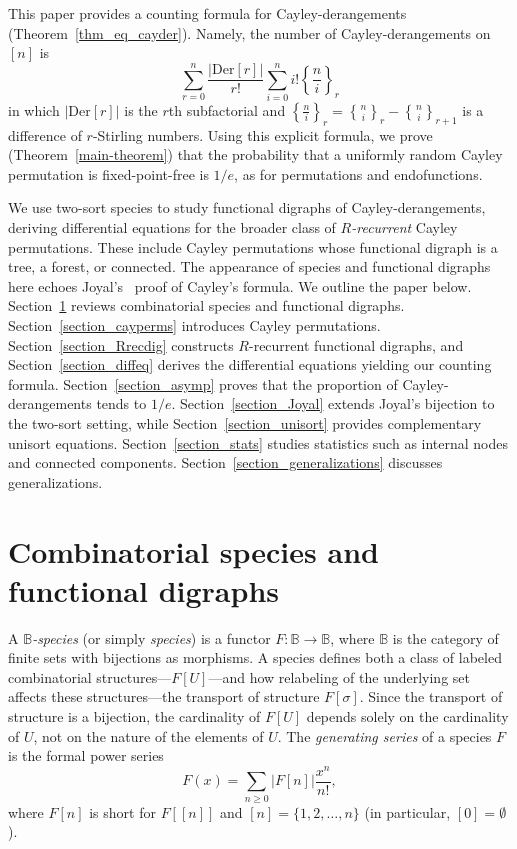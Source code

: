\documentclass[a4paper,11pt,UKenglish]{article}
\newcommand{\BB}{\mathbb{B}}
\newcommand{\Der}{\mathrm{Der}}
\newcommand{\stirl}[3]{\genfrac{\{}{\}}{0pt}{}{{#1}}{{#2}}_{{#3}}}
\newcommand{\sdiff}[3]{\genfrac{\{}{\}}{}{}{{#1}}{{#2}}_{{#3}}}
\theoremstyle{definition}
\begin{document}

This paper provides a counting formula for Cayley-derangements
(Theorem~\ref{thm_eq_cayder}). Namely, the number of Cayley-derangements
on $[n]$ is
\[
  \sum_{r=0}^n\frac{|\Der[r]|}{r!}\sum_{i=0}^ni!\sdiff{n}{i}{r}
\]
in which $|\Der[r]|$ is the $r$th subfactorial and
$\sdiff{n}{i}{r} = \stirl{n}{i}{r}-\stirl{n}{i}{r+1}$ is a difference
of $r$-Stirling numbers. Using this explicit formula,
we prove (Theorem~\ref{main-theorem}) that the probability
that a uniformly random Cayley permutation is fixed-point-free
is $1/e$, as for permutations and endofunctions.

We use two-sort species to study functional digraphs of
Cayley-derangements, deriving differential equations for the broader
class of \emph{$R$-recurrent} Cayley permutations. These include
Cayley permutations whose functional digraph is a tree, a forest,
or connected. The appearance of species and functional digraphs
here echoes Joyal's~\cite{J} proof of Cayley's formula.
We outline the paper below.
Section~\ref{section_species} reviews combinatorial species and
functional digraphs. Section~\ref{section_cayperms} introduces Cayley
permutations. Section~\ref{section_Rrecdig} constructs $R$-recurrent
functional digraphs, and Section~\ref{section_diffeq} derives the
differential equations yielding our counting formula.
Section~\ref{section_asymp} proves that the proportion of
Cayley-derangements tends to $1/e$.
Section~\ref{section_Joyal} extends Joyal's bijection to the
two-sort setting, while Section~\ref{section_unisort} provides
complementary unisort equations. Section~\ref{section_stats} studies statistics
such as internal nodes and connected components.
Section~\ref{section_generalizations} discusses generalizations.



\section{Combinatorial species and functional digraphs}\label{section_species}

A \emph{$\BB$-species} (or simply \emph{species}) is a functor
$F:\BB\to\BB$, where $\BB$ is the category of finite sets with
bijections as morphisms.  A species defines both a class of labeled
combinatorial structures---$F[U]$---and how relabeling of the
underlying set affects these structures---the transport of structure
$F[\sigma]$. Since the transport of structure is a bijection, the
cardinality of $F[U]$ depends solely on the cardinality of $U$, not on
the nature of the elements of $U$.  The \emph{generating series} of a
species $F$ is the formal power series
$$
F(x)=\sum_{n\ge 0}|F[n]|\frac{x^n}{n!},
$$
where $F[n]$ is short for $F[[n]]$ and $[n]=\{1,2,\dots,n\}$ (in
particular, $[0]=\emptyset$).
\end{document}
